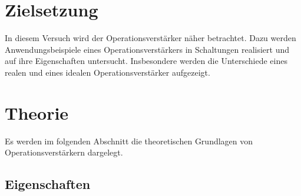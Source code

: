 \section{Zielsetzung}

\noindent
In diesem Versuch wird der Operationsverstärker näher betrachtet. Dazu werden Anwendungsbeispiele eines Operationsverstärkers in Schaltungen realisiert 
und auf ihre Eigenschaften untersucht. Insbesondere werden die Unterschiede eines realen und eines idealen Operationsverstärker aufgezeigt. 

\section{Theorie}

    \noindent
    Es werden im folgenden Abschnitt die theoretischen Grundlagen von Operationsverstärkern dargelegt. 

    \subsection{Eigenschaften}

